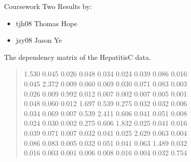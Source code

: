 \documentclass[a4paper]{article}
\begin{document}
Coursework Two Results by:
%
\begin{itemize}

\item tjh08   Thomas Hope

\item jzy08   Jason Ye

\end{itemize}

The dependency matrix of the HepatitisC data.
%
\begin{quote}

1.530  0.045  0.026  0.048  0.034  0.024  0.039  0.086  0.016 \\
0.045  2.372  0.009  0.060  0.069  0.030  0.071  0.083  0.003 \\
0.026  0.009  0.992  0.012  0.007  0.002  0.007  0.005  0.001 \\
0.048  0.060  0.012  1.697  0.539  0.275  0.032  0.032  0.006 \\
0.034  0.069  0.007  0.539  2.411  0.606  0.041  0.051  0.008 \\
0.024  0.030  0.002  0.275  0.606  1.832  0.025  0.041  0.016 \\
0.039  0.071  0.007  0.032  0.041  0.025  2.629  0.063  0.004 \\
0.086  0.083  0.005  0.032  0.051  0.041  0.063  1.489  0.032 \\
0.016  0.003  0.001  0.006  0.008  0.016  0.004  0.032  0.754 \\

\end{quote}
\end{document}
